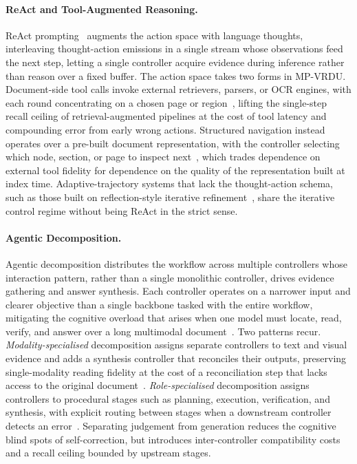 \documentclass[11pt]{article}
\begin{document}
\paragraph{ReAct and Tool-Augmented Reasoning.} ReAct prompting~\cite{yao2022react} augments the action space with language thoughts, interleaving thought-action emissions in a single stream whose observations feed the next step, letting a single controller acquire evidence during inference rather than reason over a fixed buffer. The action space takes two forms in MP-VRDU. Document-side tool calls invoke external retrievers, parsers, or OCR engines, with each round concentrating on a chosen page or region~\cite{sun2025docagent,wu2025docreact}, lifting the single-step recall ceiling of retrieval-augmented pipelines at the cost of tool latency and compounding error from early wrong actions. Structured navigation instead operates over a pre-built document representation, with the controller selecting which node, section, or page to inspect next~\cite{zheng2026docv}, which trades dependence on external tool fidelity for dependence on the quality of the representation built at index time. Adaptive-trajectory systems that lack the thought-action schema, such as those built on reflection-style iterative refinement~\cite{jain2025simpledoc}, share the iterative control regime without being ReAct in the strict sense.

\paragraph{Agentic Decomposition.} Agentic decomposition distributes the workflow across multiple controllers whose interaction pattern, rather than a single monolithic controller, drives evidence gathering and answer synthesis. Each controller operates on a narrower input and clearer objective than a single backbone tasked with the entire workflow, mitigating the cognitive overload that arises when one model must locate, read, verify, and answer over a long multimodal document~\cite{yu2025mact}. Two patterns recur. \textit{Modality-specialised} decomposition assigns separate controllers to text and visual evidence and adds a synthesis controller that reconciles their outputs, preserving single-modality reading fidelity at the cost of a reconciliation step that lacks access to the original document~\cite{han2025mdocagent,duan2025m2rag}. \textit{Role-specialised} decomposition assigns controllers to procedural stages such as planning, execution, verification, and synthesis, with explicit routing between stages when a downstream controller detects an error~\cite{yu2025mact,sun2025docagent}. Separating judgement from generation reduces the cognitive blind spots of self-correction, but introduces inter-controller compatibility costs and a recall ceiling bounded by upstream stages.
\end{document}
